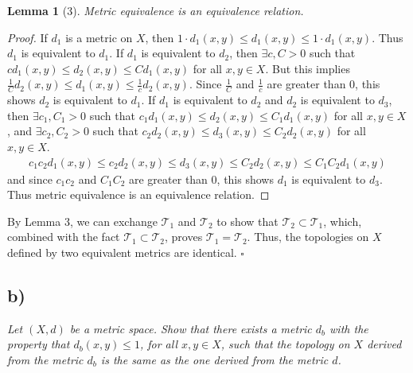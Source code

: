 \documentclass[12pt]{article}
\theoremstyle{plain}
\newtheorem*{lemma*}{Lemma}
\begin{document}
\begin{lemma*}[3]
    Metric equivalence is an equivalence relation.
\end{lemma*}
\begin{proof}
    If $d_1$ is a metric on $X$, then $1\cdot d_1(x,y) \leq d_1(x,y) \leq 1\cdot d_1(x,y)$.  Thus $d_1$ is equivalent to $d_1$.  If $d_1$ is equivalent to $d_2$, then $\exists c,C > 0$ such that $cd_1(x,y) \leq d_2(x,y) \leq Cd_1(x,y)$ for all $x, y \in X$.  But this implies $\frac{1}{C}d_2(x,y) \leq d_1(x,y) \leq \frac{1}{c}d_2(x,y)$.  Since $\frac{1}{C}$ and $\frac{1}{c}$ are greater than $0$, this shows $d_2$ is equivalent to $d_1$.  If $d_1$ is equivalent to $d_2$ and $d_2$ is equivalent to $d_3$, then $\exists c_1,C_1 > 0$ such that $c_1d_1(x,y) \leq d_2(x,y) \leq C_1d_1(x,y)$ for all $x,y\in X$, and $\exists c_2,C_2 > 0$ such that $c_2d_2(x,y) \leq d_3(x,y) \leq C_2d_2(x,y)$ for all $x,y \in X$.
    \begin{align*}
        c_1c_2d_1(x,y) \leq c_2d_2(x,y) \leq d_3(x,y) \leq C_2d_2(x,y) \leq C_1C_2d_1(x,y)
    \end{align*}
    and since $c_1c_2$ and $C_1C_2$ are greater than $0$, this shows $d_1$ is equivalent to $d_3$.  Thus metric equivalence is an equivalence relation.
\end{proof}

By Lemma 3, we can exchange $\mathcal{T}_1$ and $\mathcal{T}_2$ to show that $\mathcal{T}_2 \subset \mathcal{T}_1$, which, combined with the fact $\mathcal{T}_1 \subset \mathcal{T}_2$, proves $\mathcal{T}_1 = \mathcal{T}_2$.  Thus, the topologies on $X$ defined by two equivalent metrics are identical. \hfill $\square$

\subsection*{ b)}
\emph{Let $(X, d)$ be a metric space.  Show that there exists a metric $d_b$ with the property that $d_b(x,y) \leq 1$, for all $x,y \in X$, such that the topology on $X$ derived from the metric $d_b$ is the same as the one derived from the metric $d$.} \\
\end{document}

